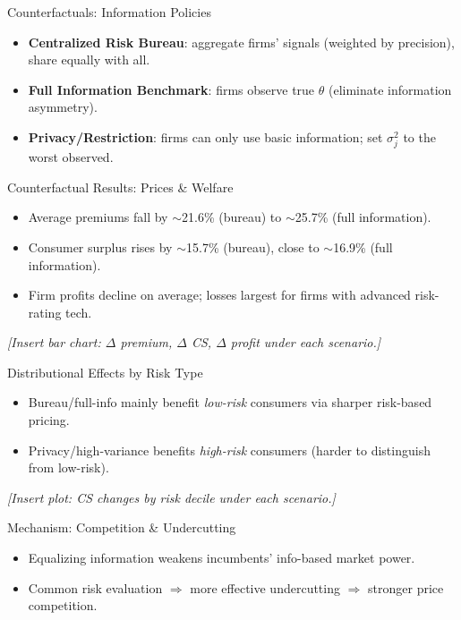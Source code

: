 \documentclass[10pt,aspectratio=169]{beamer}
\begin{document}
\begin{frame}{Counterfactuals: Information Policies}
\justifying
\begin{itemize}
  \item \textbf{Centralized Risk Bureau}: aggregate firms’ signals (weighted by precision), share equally with all.
  \item \textbf{Full Information Benchmark}: firms observe true $\theta$ (eliminate information asymmetry).
  \item \textbf{Privacy/Restriction}: firms can only use basic information; set $\sigma_j^2$ to the worst observed.
\end{itemize}
\end{frame}

\begin{frame}{Counterfactual Results: Prices \& Welfare}
\justifying
\begin{itemize}
  \item Average premiums fall by $\sim$21.6\% (bureau) to $\sim$25.7\% (full information).
  \item Consumer surplus rises by $\sim$15.7\% (bureau), close to $\sim$16.9\% (full information).
  \item Firm profits decline on average; losses largest for firms with advanced risk-rating tech.
\end{itemize}
\vspace{0.75em}
\begin{center}
\textit{[Insert bar chart: $\Delta$ premium, $\Delta$ CS, $\Delta$ profit under each scenario.]}
\end{center}
\end{frame}

\begin{frame}{Distributional Effects by Risk Type}
\justifying
\begin{itemize}
  \item Bureau/full-info mainly benefit \emph{low-risk} consumers via sharper risk-based pricing.
  \item Privacy/high-variance benefits \emph{high-risk} consumers (harder to distinguish from low-risk).
\end{itemize}
\vspace{0.75em}
\begin{center}
\textit{[Insert plot: CS changes by risk decile under each scenario.]}
\end{center}
\end{frame}

\begin{frame}{Mechanism: Competition \& Undercutting}
\justifying
\begin{itemize}
  \item Equalizing information weakens incumbents’ info-based market power.
  \item Common risk evaluation $\Rightarrow$ more effective undercutting $\Rightarrow$ stronger price competition.
\end{itemize}
\end{frame}
\end{document}
